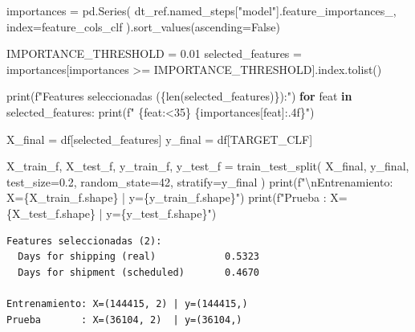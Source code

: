\documentclass[
  letterpaper,
  DIV=11,
  numbers=noendperiod]{scrartcl}
\newenvironment{Shaded}{\begin{snugshade}}{\end{snugshade}}
\newcommand{\BuiltInTok}[1]{\textcolor[rgb]{0.00,0.23,0.31}{#1}}
\newcommand{\CharTok}[1]{\textcolor[rgb]{0.13,0.47,0.30}{#1}}
\newcommand{\ControlFlowTok}[1]{\textcolor[rgb]{0.00,0.23,0.31}{\textbf{#1}}}
\newcommand{\DecValTok}[1]{\textcolor[rgb]{0.68,0.00,0.00}{#1}}
\newcommand{\FloatTok}[1]{\textcolor[rgb]{0.68,0.00,0.00}{#1}}
\newcommand{\KeywordTok}[1]{\textcolor[rgb]{0.00,0.23,0.31}{\textbf{#1}}}
\newcommand{\NormalTok}[1]{\textcolor[rgb]{0.00,0.23,0.31}{#1}}
\newcommand{\OperatorTok}[1]{\textcolor[rgb]{0.37,0.37,0.37}{#1}}
\newcommand{\SpecialCharTok}[1]{\textcolor[rgb]{0.37,0.37,0.37}{#1}}
\newcommand{\SpecialStringTok}[1]{\textcolor[rgb]{0.13,0.47,0.30}{#1}}
\newcommand{\StringTok}[1]{\textcolor[rgb]{0.13,0.47,0.30}{#1}}
\newcommand{\VariableTok}[1]{\textcolor[rgb]{0.07,0.07,0.07}{#1}}
\begin{document}
\begin{Shaded}
\begin{Highlighting}[]
\NormalTok{importances }\OperatorTok{=}\NormalTok{ pd.Series(}
\NormalTok{    dt\_ref.named\_steps[}\StringTok{"model"}\NormalTok{].feature\_importances\_,}
\NormalTok{    index}\OperatorTok{=}\NormalTok{feature\_cols\_clf}
\NormalTok{).sort\_values(ascending}\OperatorTok{=}\VariableTok{False}\NormalTok{)}

\NormalTok{IMPORTANCE\_THRESHOLD }\OperatorTok{=} \FloatTok{0.01}
\NormalTok{selected\_features }\OperatorTok{=}\NormalTok{ importances[importances }\OperatorTok{\textgreater{}=}\NormalTok{ IMPORTANCE\_THRESHOLD].index.tolist()}

\BuiltInTok{print}\NormalTok{(}\SpecialStringTok{f"Features seleccionadas (}\SpecialCharTok{\{}\BuiltInTok{len}\NormalTok{(selected\_features)}\SpecialCharTok{\}}\SpecialStringTok{):"}\NormalTok{)}
\ControlFlowTok{for}\NormalTok{ feat }\KeywordTok{in}\NormalTok{ selected\_features:}
    \BuiltInTok{print}\NormalTok{(}\SpecialStringTok{f"  }\SpecialCharTok{\{}\NormalTok{feat}\SpecialCharTok{:\textless{}35\}}\SpecialStringTok{ }\SpecialCharTok{\{}\NormalTok{importances[feat]}\SpecialCharTok{:.4f\}}\SpecialStringTok{"}\NormalTok{)}

\NormalTok{X\_final }\OperatorTok{=}\NormalTok{ df[selected\_features]}
\NormalTok{y\_final }\OperatorTok{=}\NormalTok{ df[TARGET\_CLF]}

\NormalTok{X\_train\_f, X\_test\_f, y\_train\_f, y\_test\_f }\OperatorTok{=}\NormalTok{ train\_test\_split(}
\NormalTok{    X\_final, y\_final, test\_size}\OperatorTok{=}\FloatTok{0.2}\NormalTok{, random\_state}\OperatorTok{=}\DecValTok{42}\NormalTok{, stratify}\OperatorTok{=}\NormalTok{y\_final}
\NormalTok{)}
\BuiltInTok{print}\NormalTok{(}\SpecialStringTok{f"}\CharTok{\textbackslash{}n}\SpecialStringTok{Entrenamiento: X=}\SpecialCharTok{\{}\NormalTok{X\_train\_f}\SpecialCharTok{.}\NormalTok{shape}\SpecialCharTok{\}}\SpecialStringTok{ | y=}\SpecialCharTok{\{}\NormalTok{y\_train\_f}\SpecialCharTok{.}\NormalTok{shape}\SpecialCharTok{\}}\SpecialStringTok{"}\NormalTok{)}
\BuiltInTok{print}\NormalTok{(}\SpecialStringTok{f"Prueba       : X=}\SpecialCharTok{\{}\NormalTok{X\_test\_f}\SpecialCharTok{.}\NormalTok{shape}\SpecialCharTok{\}}\SpecialStringTok{  | y=}\SpecialCharTok{\{}\NormalTok{y\_test\_f}\SpecialCharTok{.}\NormalTok{shape}\SpecialCharTok{\}}\SpecialStringTok{"}\NormalTok{)}
\end{Highlighting}
\end{Shaded}

\begin{verbatim}
Features seleccionadas (2):
  Days for shipping (real)            0.5323
  Days for shipment (scheduled)       0.4670

Entrenamiento: X=(144415, 2) | y=(144415,)
Prueba       : X=(36104, 2)  | y=(36104,)
\end{verbatim}
\end{document}
